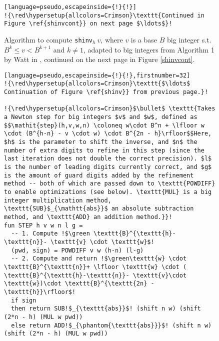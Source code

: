 \begin{figure}
\begin{lstlisting}[language=pseudo,escapeinside={!}{!}]
!{\red\hypersetup{allcolors=Crimson}\texttt{Continued in Figure \ref{shinvcont}} on next page $\ldots$}!
\end{lstlisting}
  \caption{\footnotesize Algorithm to compute \texttt{shinv}$_h~v$, where $v$ is a base $B$ big integer s.t.\ $B^k \leq v < B^{k+1}$ and $k\neq 1$, adapted to big integers from Algorithm 1 by Watt in \cite{watt2023efficient}, continued on the next page in Figure \ref{shinvcont}.}
  \label{shinv}
\end{figure}
\begin{figure}
\begin{lstlisting}[language=pseudo,escapeinside={!}{!},firstnumber=32]
!{\red\hypersetup{allcolors=Crimson}\texttt{$\ldots$ Continuation of Figure \ref{shinv}} from previous page.}!

!{\red\hypersetup{allcolors=Crimson}$\bullet$ \texttt{Takes a Newton step for big integers $v$ and $w$, defined as $$\mathit{step}(h,v,w,n) \coloneq w\cdot B^n + \lfloor w \cdot (B^{h-n} - v \cdot w) \cdot B^{2n - h}\rfloor$$Here, $h$ is the parameter to shift the inverse, and $n$ the number of extra digits to refine in this step (since the last iteration does not double the correct precision). $l$ is the number of leading digits currently correct, and $g$ is the amount of guard digits added by the refinement method -- both of which are passed down to \texttt{POWDIFF} to enable optimizations (see below). \texttt{MUL} is a big integer multiplication method, \texttt{SUB}$_{\mathtt{abs}}$ an absolute subtraction method, and \texttt{ADD} an addition method.}}!
fun STEP h v w n l g =
  -- 1. Compute !$\green \texttt{B}^{\texttt{h}- \texttt{n}}- \texttt{v} \cdot \texttt{w}$!
  (pwd, sign) = POWDIFF v w (h-n) (l-g)
  -- 2. Compute and return !$\green\texttt{w} \cdot \texttt{B}^{\texttt{n}}+ \lfloor \texttt{w} \cdot ( \texttt{B}^{\texttt{h}-\texttt{n}}- \texttt{v}\cdot \texttt{w})\cdot \texttt{B}^{\texttt{2n} - \texttt{h}}\rfloor$!
  if sign
  then return SUB!$_{\texttt{abs}}$! (shift n w) (shift (2*n - h) (MUL w pwd))
  else return ADD!$_{\phantom{\texttt{abs}}}$! (shift n w) (shift (2*n - h) (MUL w pwd))


\end{lstlisting}
\end{figure}
